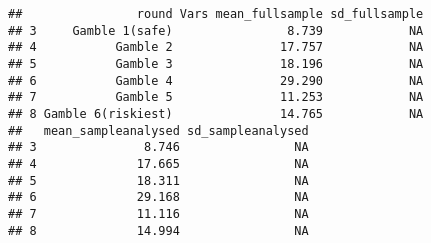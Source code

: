 \documentclass[]{article}
\newenvironment{Shaded}{\begin{snugshade}}{\end{snugshade}}
\newcommand{\KeywordTok}[1]{\textcolor[rgb]{0.13,0.29,0.53}{\textbf{#1}}}
\newcommand{\DataTypeTok}[1]{\textcolor[rgb]{0.13,0.29,0.53}{#1}}
\newcommand{\DecValTok}[1]{\textcolor[rgb]{0.00,0.00,0.81}{#1}}
\newcommand{\StringTok}[1]{\textcolor[rgb]{0.31,0.60,0.02}{#1}}
\newcommand{\OperatorTok}[1]{\textcolor[rgb]{0.81,0.36,0.00}{\textbf{#1}}}
\newcommand{\NormalTok}[1]{#1}
\begin{document}
\begin{verbatim}
##                round Vars mean_fullsample sd_fullsample
## 3     Gamble 1(safe)                8.739            NA
## 4           Gamble 2               17.757            NA
## 5           Gamble 3               18.196            NA
## 6           Gamble 4               29.290            NA
## 7           Gamble 5               11.253            NA
## 8 Gamble 6(riskiest)               14.765            NA
##   mean_sampleanalysed sd_sampleanalysed
## 3               8.746                NA
## 4              17.665                NA
## 5              18.311                NA
## 6              29.168                NA
## 7              11.116                NA
## 8              14.994                NA
\end{verbatim}

\begin{Shaded}
\end{Shaded}
\end{document}
